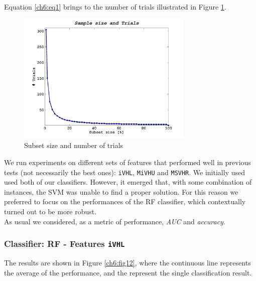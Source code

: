 Equation \ref{ch6:eq1} brings to the number of trials illustrated in Figure \ref{ch6:fig11}.

\begin{figure}[!hbf]
 \begin{center}
  \includegraphics[width=0.75\textwidth]{./images/exp04/iVHL_trials.png}
  \caption[subset size and trials]{Subset size and number of trials}
  \label{ch6:fig11}
 \end{center}
\end{figure}

We run experiments on different sets of features that performed well in previous tests (not necessarily the best ones): \texttt{iVHL}, \texttt{MiVHU} and \texttt{MSVHR}.
We initially used used both of our classifiers. However, it emerged that, with some combination of instances, the \Gls{SVM} was unable to find a proper solution.
For this reason we preferred to focus on the performances of the \Gls{RF} classifier, which contextually turned out to be more robust.\\
As usual we considered, as a metric of performance, \textit{AUC} and \textit{accuracy}.

\vspace{0.5cm}

\subsubsection{Classifier: RF - Features \texttt{iVHL}}

The results are shown in Figure \ref{ch6:fig12}, where the continuous line represents the average of the performance, and the \textasteriskcentered represent the
single classification result.

